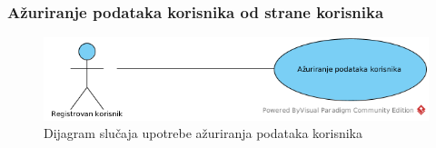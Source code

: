 \subsubsection{Ažuriranje podataka korisnika od strane korisnika}

\begin{figure}[H]
\begin{center}
\includegraphics[width=\textwidth]{Pictures/uc_update_user_profile.png}
\end{center}
    \caption{Dijagram slučaja upotrebe ažuriranja podataka korisnika}
\label{fig:UCUpdateUserProfile}
\end{figure}

